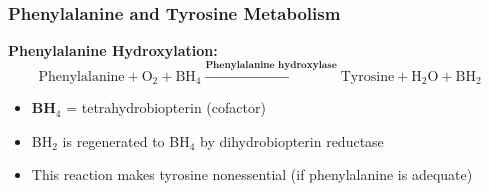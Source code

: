 \subsubsection{Phenylalanine and Tyrosine Metabolism}

\textbf{Phenylalanine Hydroxylation:}
\[
\text{Phenylalanine} + \text{O}_2 + \text{BH}_4 \xrightarrow{\textbf{Phenylalanine hydroxylase}} \text{Tyrosine} + \text{H}_2\text{O} + \text{BH}_2
\]

\begin{itemize}
    \item \textbf{BH$_4$} = tetrahydrobiopterin (cofactor)
    \item BH$_2$ is regenerated to BH$_4$ by dihydrobiopterin reductase
    \item This reaction makes tyrosine nonessential (if phenylalanine is adequate)
\end{itemize}

